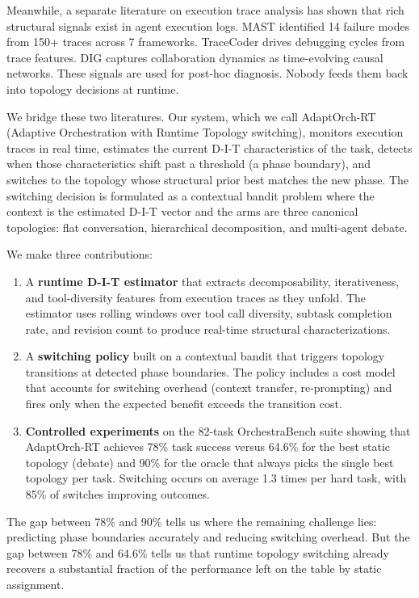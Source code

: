 Meanwhile, a separate literature on execution trace analysis has shown
that rich structural signals exist in agent execution logs. MAST
\citep{cemri_2025} identified 14 failure modes from 150+ traces across 7
frameworks. TraceCoder \citep{tracecoder_2026} drives debugging cycles
from trace features. DIG \citep{dig_2026} captures collaboration
dynamics as time-evolving causal networks. These signals are used for
post-hoc diagnosis. Nobody feeds them back into topology decisions at
runtime.

We bridge these two literatures. Our system, which we call AdaptOrch-RT
(Adaptive Orchestration with Runtime Topology switching), monitors
execution traces in real time, estimates the current D-I-T
characteristics of the task, detects when those characteristics shift
past a threshold (a phase boundary), and switches to the topology whose
structural prior best matches the new phase. The switching decision is
formulated as a contextual bandit problem where the context is the
estimated D-I-T vector and the arms are three canonical topologies: flat
conversation, hierarchical decomposition, and multi-agent debate.

We make three contributions:

\begin{enumerate}
\item A \textbf{runtime D-I-T estimator} that extracts decomposability, iterativeness, and tool-diversity features from execution traces as they unfold. The estimator uses rolling windows over tool call diversity, subtask completion rate, and revision count to produce real-time structural characterizations.

\item A \textbf{switching policy} built on a contextual bandit that triggers topology transitions at detected phase boundaries. The policy includes a cost model that accounts for switching overhead (context transfer, re-prompting) and fires only when the expected benefit exceeds the transition cost.

\item \textbf{Controlled experiments} on the 82-task OrchestraBench suite showing that AdaptOrch-RT achieves 78\% task success versus 64.6\% for the best static topology (debate) and 90\% for the oracle that always picks the single best topology per task. Switching occurs on average 1.3 times per hard task, with 85\% of switches improving outcomes.
\end{enumerate}

The gap between 78\% and 90\% tells us where the remaining challenge
lies: predicting phase boundaries accurately and reducing switching
overhead. But the gap between 78\% and 64.6\% tells us that runtime
topology switching already recovers a substantial fraction of the
performance left on the table by static assignment.
